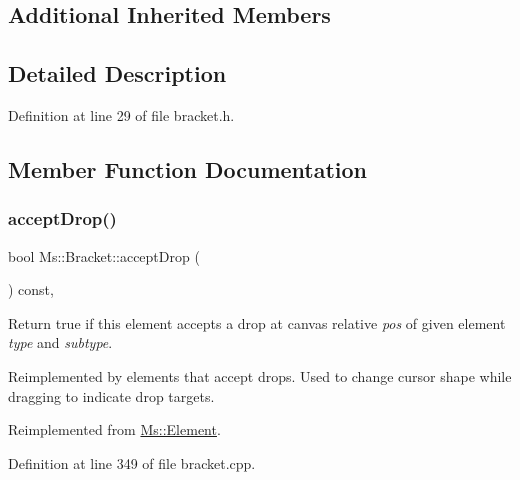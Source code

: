 \subsection*{Additional Inherited Members}


\subsection{Detailed Description}


Definition at line 29 of file bracket.\+h.



\subsection{Member Function Documentation}
\mbox{\label{class_ms_1_1_bracket_aaa614e8c10e3b8106c21b8f54f1f2530}} 
\subsubsection{\texorpdfstring{accept\+Drop()}{acceptDrop()}}
{\footnotesize\ttfamily bool Ms\+::\+Bracket\+::accept\+Drop (\begin{DoxyParamCaption}\item[{\hyperlink{class_ms_1_1_edit_data}{Edit\+Data} \&}]{ }\end{DoxyParamCaption}) const\hspace{0.3cm}{\ttfamily [override]}, {\ttfamily [virtual]}}

Return true if this element accepts a drop at canvas relative {\itshape pos} of given element {\itshape type} and {\itshape subtype}.

Reimplemented by elements that accept drops. Used to change cursor shape while dragging to indicate drop targets. 

Reimplemented from \hyperlink{class_ms_1_1_element_a35614445f0bc2212cbcc75c3f5810543}{Ms\+::\+Element}.



Definition at line 349 of file bracket.\+cpp.

\mbox{\label{class_ms_1_1_bracket_a09f6e7e760bff48faef75b12db95755e}} 
